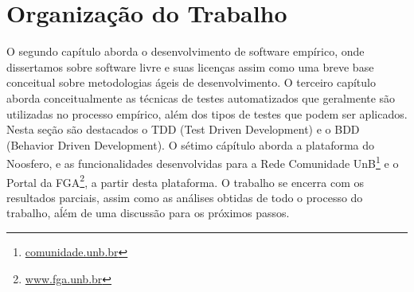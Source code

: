 	\section{Organização do Trabalho}
	
	
	O segundo capítulo aborda o desenvolvimento de software empírico, onde dissertamos sobre software livre 
	e suas licenças assim como uma breve base conceitual sobre metodologias ágeis de desenvolvimento.
	O terceiro capítulo aborda conceitualmente as técnicas de testes automatizados que geralmente
	são utilizadas no processo empírico, além dos tipos de testes que podem ser aplicados. Nesta seção são 
	destacados o TDD (Test Driven Development) e o BDD (Behavior Driven Development).
	O sétimo cápítulo aborda a plataforma do Noosfero, e as funcionalidades desenvolvidas para a Rede Comunidade UnB\footnote{\url{comunidade.unb.br}} e o Portal da FGA\footnote{\url{www.fga.unb.br}}, a partir desta plataforma.
	O trabalho se encerra com os resultados parciais, assim como as análises obtidas de todo o processo do trabalho, aĺém de uma discussão para os próximos passos.


